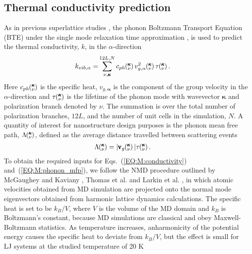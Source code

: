 \subsection{Thermal conductivity prediction}\label{SEC:methods}

As in previous superlattice studies \cite{Luckyanova16112012,doi:10.1021/nl202186y}, the phonon Boltzmann Transport Equation (BTE) under the single mode relaxation time approximation \cite{ziman_electrons_2001}, is used to predict the thermal conductivity, $k$, in the $\alpha$-direction
\begin{equation}\label{EQ:M:conductivity}
\begin{split}
k_{vib,\mathbf{\alpha}}=&\sum_{\nu,\pmb{\kappa}}^{12L,N} c_{ph}\kv
v^{2}_{g,\mathbf{\alpha}}\kv \tau\kv.
\end{split}
\end{equation}
Here $c_{ph}\mspace{-4.0mu}\left(\mspace{-8.0mu} \begin{smallmatrix}&\pmb{\kappa} \\&\nu\end{smallmatrix} \mspace{-3.0mu}\right)$ is the specific heat, $v_{g,\mathbf{\alpha}}$ is the component of the group velocity in the $\alpha$-direction and $\tau\mspace{-4.0mu}\left(\mspace{-8.0mu} \begin{smallmatrix}&\pmb{\kappa} \\&\nu\end{smallmatrix} \mspace{-3.0mu}\right)$ is the lifetime of the phonon mode with wavevector $\pmb{\kappa}$ and polarization branch denoted by $\nu$. The summation is over the total number of polarization branches, $12L$, and the number of unit cells in the simulation, $N$. A quantity of interest for nanostructure design purposes \cite{PhysRevB.87.035437} is the phonon mean free path, $\Lambda\mspace{-4.0mu}\left(\mspace{-8.0mu} \begin{smallmatrix}&\pmb{\kappa} \\&\nu\end{smallmatrix} \mspace{-3.0mu}\right)$, defined as the average distance travelled between scattering events \cite{ziman_electrons_2001}
\begin{equation}\label{EQ:M:phonon_mfp}
\begin{split}
\Lambda\kv &= |\pmb{\mathrm{v}}_{g}\kv | \tau\kv.
\end{split}
\end{equation}
To obtain the required inputs for Eqs.~(\ref{EQ:M:conductivity}) and~(\ref{EQ:M:phonon_mfp}), we follow the NMD procedure outlined by McGaughey and Kaviany \cite{PhysRevB.71.184305}, Thomas et al. \cite {PhysRevB.81.081411} and Larkin et al. \cite{jason_inpress}, in which atomic velocities obtained from MD simulation are projected onto the normal mode eigenvectors obtained from harmonic lattice dynamics calculations. The specific heat is set to be $k_B/V$, where $V$ is the volume of the MD domain and $k_B$ is Boltzmann's constant, because MD simulations are classical and obey Maxwell-Boltzmann statistics. As temperature increases, anharmonicity of the potential energy causes the specific heat to deviate from $k_B/V$, but the effect is small for LJ systems at the studied temperature of 20 K \cite{PhysRevB.71.184305}

